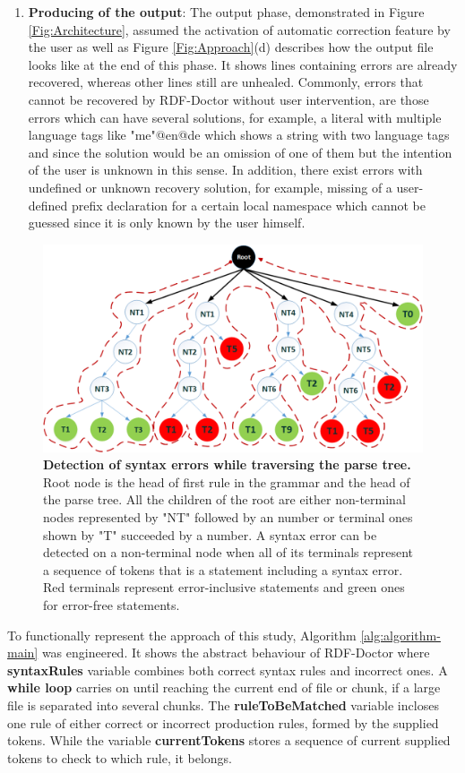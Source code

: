 \begin{enumerate}[label=(\alph*)]
\item\textbf {Producing of the output}: The output phase, demonstrated in Figure \ref{Fig:Architecture}, assumed the activation of automatic correction feature by the user as well as {Figure \ref{Fig:Approach}}(d) describes how the output file looks like at the end of this phase.    It shows lines containing errors are already recovered, whereas other lines still are unhealed. Commonly, errors that cannot be recovered by RDF-Doctor without user intervention, are those errors which can have several solutions, for example, a literal with multiple language tags like "me"@en@de which shows a string with two language tags and since the solution would be an omission of one of them but the intention of the user is unknown in this sense. In addition, there exist errors with undefined or unknown recovery solution, for example, missing of a user-defined prefix declaration for a certain local namespace which cannot be guessed since it is only known by the user himself. 
\end{enumerate} 
\begin{figure}
	\centering
	  	\includegraphics[width=.8\textwidth]{images/approachParseTree.png}
		\caption{\textbf{Detection of syntax errors while traversing the parse tree.} 
		Root node is the head of first rule in the grammar and the head of the parse tree.
		All the children of the root are either non-terminal nodes represented by "NT" followed by an number or  terminal ones shown by "T" succeeded by a number. 
		A syntax error can be detected on a non-terminal node when all of its terminals represent a sequence of tokens that is a statement including a syntax error. Red terminals represent error-inclusive statements and green ones for error-free statements.}
		\label{Fig:approachParseTree}  
\end{figure}


To functionally represent the approach of this study, Algorithm \ref{alg:algorithm-main} was engineered. 
It shows the abstract behaviour of RDF-Doctor where \textbf{syntaxRules} variable combines both correct syntax rules and incorrect ones. 
A \textbf{while loop} carries on until reaching the current end of file or chunk, if a large file is separated into several chunks. 
The \textbf{ruleToBeMatched} variable incloses one rule of either correct or incorrect production rules, formed by the supplied tokens. While the variable \textbf{currentTokens} stores a sequence of current supplied tokens to check to which rule, it belongs.  

